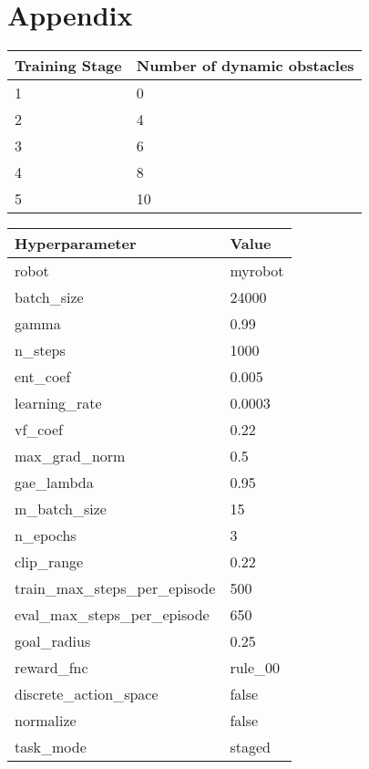 \chapter{Appendix}\label{appdx1}%
\begin{table}[!h]
 \centering
 \label{table:training-curriculum}
 \begin{tabular}{|l|l|}
 \hline
 \textbf{Training Stage} & \textbf{Number of dynamic obstacles} \\ \hline
 1 & 0 \\ \hline
 2 & 4 \\ \hline
 3 & 6 \\ \hline
 4 & 8 \\ \hline
 5 & 10 \\ \hline
 \end{tabular}
 \bigskip
\end{table}

\begin{table}[!h]
 \centering
 \label{table:hyperparameters-mpc}
 \begin{tabular}{|l|l|}
 \hline
 \textbf{Hyperparameter} & \textbf{Value} \\ \hline
 robot & myrobot \\ \hline
 batch\_size & 24000 \\ \hline
 gamma & 0.99 \\ \hline
 n\_steps & 1000 \\ \hline
 ent\_coef & 0.005 \\ \hline
 learning\_rate & 0.0003 \\ \hline
 vf\_coef & 0.22 \\ \hline
 max\_grad\_norm & 0.5 \\ \hline
 gae\_lambda & 0.95 \\ \hline
 m\_batch\_size & 15 \\ \hline
 n\_epochs & 3 \\ \hline
 clip\_range & 0.22 \\ \hline
 train\_max\_steps\_per\_episode & 500 \\ \hline
 eval\_max\_steps\_per\_episode & 650 \\ \hline
 goal\_radius & 0.25 \\ \hline
 reward\_fnc & rule\_00 \\ \hline
 discrete\_action\_space & false \\ \hline
 normalize & false \\ \hline
 task\_mode & staged \\ \hline
 \end{tabular}
 \bigskip
\end{table}

